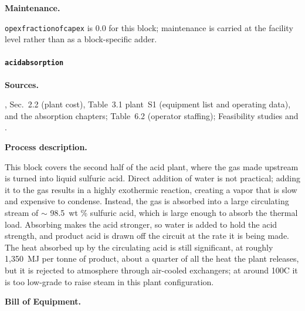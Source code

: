 \documentclass{article}
\renewcommand\_{\textunderscore\allowbreak}
\begin{document}
\medskip
\noindent\textbf{Maintenance.}\quad
 
\texttt{opex\_fraction\_of\_capex} is 0.0 for this block; maintenance is carried at the facility level rather than as a block-specific adder.

\clearpage
\paragraph{\texttt{acid\_absorption}}\label{app:04-methods-blockdefs-acidabsorption}\leavevmode\par
 
\medskip
\noindent\textbf{Sources.}\quad
 
\citet{davenportSulfuricAcidManufacture2006}, Sec.~2.2 (plant cost), Table~3.1 plant~S1 (equipment list and operating data), and the absorption chapters; \citet{ulrichChemicalEngineeringProcess2004} Table~6.2 (operator staffing); Feasibility studies \citet{sgscanadaincSK1300Technical2024} and \citet{rothFeasibilityStudyNational2022}. 

\medskip
\noindent\textbf{Process description.}\quad
 
This block covers the second half of the acid plant, where the  gas made upstream is turned into liquid sulfuric acid. Direct addition of water is not practical; adding it to the gas results in a highly exothermic reaction, creating a vapor that is slow and expensive to condense. Instead, the gas is absorbed into a large circulating stream of $\sim$ 98.5~wt \% sulfuric acid, which is large enough to absorb the thermal load. Absorbing  makes the acid stronger, so water is added to hold the acid strength, and product acid is drawn off the circuit at the rate it is being made. The heat absorbed up by the circulating acid is still significant, at roughly 1,350~MJ per tonne of product, about a quarter of all the heat the plant releases, but it is rejected to atmosphere through air-cooled exchangers; at around 100\textdegree C it is too low-grade to raise steam in this plant configuration.

\medskip
\noindent\textbf{Bill of Equipment.}\quad
 
\end{document}

